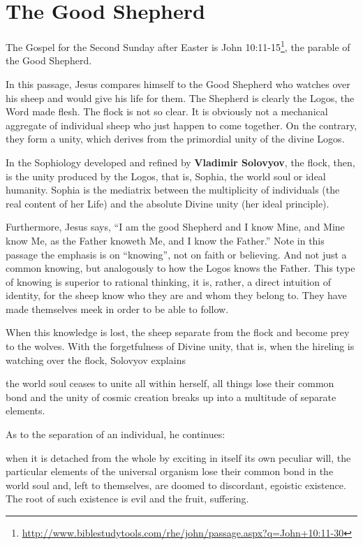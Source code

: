 \section{The Good Shepherd}

The Gospel for the Second Sunday after Easter is John 10:11-15\footnote{\url{http://www.biblestudytools.com/rhe/john/passage.aspx?q=John+10:11-30}}, the parable of the Good Shepherd.

In this passage, Jesus compares himself to the Good Shepherd who watches over his sheep and would give his life for them. The Shepherd is clearly the Logos, the Word made flesh. The flock is not so clear. It is obviously not a mechanical aggregate of individual sheep who just happen to come together. On the contrary, they form a unity, which derives from the primordial unity of the divine Logos.

In the Sophiology developed and refined by \textbf{Vladimir Solovyov}, the flock, then, is the unity produced by the Logos, that is, Sophia, the world soul or ideal humanity. Sophia is the mediatrix between the multiplicity of individuals (the real content of her Life) and the absolute Divine unity (her ideal principle).

Furthermore, Jesus says, ``I am the good Shepherd and I know Mine, and Mine know Me, as the Father knoweth Me, and I know the Father.'' Note in this passage the emphasis is on ``knowing'', not on faith or believing. And not just a common knowing, but analogously to how the Logos knows the Father. This type of knowing is superior to rational thinking, it is, rather, a direct intuition of identity, for the sheep know who they are and whom they belong to. They have made themselves meek in order to be able to follow.

When this knowledge is lost, the sheep separate from the flock and become prey to the wolves. With the forgetfulness of Divine unity, that is, when the hireling is watching over the flock, Solovyov explains

\begin{quotex}
the world soul ceases to unite all within herself, all things lose their common bond and the unity of cosmic creation breaks up into a multitude of separate elements.
\end{quotex}


As to the separation of an individual, he continues:

\begin{quotex}
when it is detached from the whole by exciting in itself its own peculiar will, the particular elements of the universal organism lose their common bond in the world soul and, left to themselves, are doomed to discordant, egoistic existence. The root of such existence is evil and the fruit, suffering.
\end{quotex}



